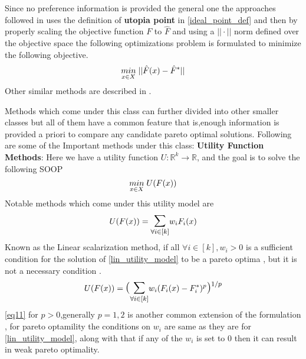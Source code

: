Since no preference information is provided the general one the approaches followed in \cite{zeleny1973compromise} uses the definition of \textbf{utopia point} in \ref{ideal_point_def} and then by properly scaling the objective function $F$ to $\hat{F}$ and using a $||\cdot||$ norm defined over the objective space the following optimizations problem is formulated to minimize the following objective.
\begin{equation}
    \underset{x \in X}{min}\hspace{1mm} ||\hat{F}(x) - \hat{F}^{*}||
\end{equation}
\newline Other similar methods are described in \cite{miettinen1998}.

Methods which come under this class can further divided into other smaller classes but all of them have a common feature that is,enough information is provided a priori to compare any candidate pareto optimal solutions.
\newline Following are some of the Important methods under this class:
\newline \newline \textbf{Utility Function Methods}: Here we have a utility function $U: \mathbb{R}^k \to \mathbb{R}$, and the goal is to solve the following SOOP
\begin{equation}
    \underset{x \in X}{min}\hspace{1mm} U(F(x))
\end{equation}
\newline Notable methods which come under this utility model are
\begin{equation} \label{lin_utility_model}
    U(F(x)) = \mathlarger{\mathlarger{\sum}}_{\forall i\in [k]} w_i F_i(x)
\end{equation}
\newline Known as the Linear scalarization method, if all $\forall i \in [k], w_i > 0$ is a sufficient condition for the solution of \ref{lin_utility_model} to be a pareto optima \cite{zadeh1963optimality}, but it is not a necessary condition \cite{zionts1989multiple}.
\begin{equation} \label{eq11}
    U(F(x)) = \mathlarger{\mathlarger{( \sum}}_{\forall i\in [k]} w_i (F_i(x)-F^{*}_i)^p \mathlarger{\mathlarger{) }}^{1/p}
\end{equation}
\newline \ref{eq11} for $p>0$,generally $p=1,2$ is another common extension of the formulation \cite{yu1976compromise}, for pareto optamility the conditions on $w_i$ are same as they are for \ref{lin_utility_model}, along with that if any of the $w_i$ is set to $0$ then it can result in weak pareto optimality.
